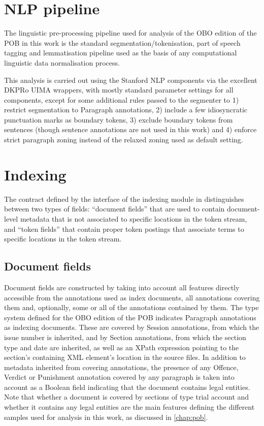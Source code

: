 \section{NLP pipeline}

The linguistic pre-processing pipeline used for analysis of the OBO edition of the POB in this work is the standard segmentation/tokenisation, part of speech tagging and lemmatisation pipeline used as the basis of any computational linguistic data normalisation process.

This analysis is carried out using the Stanford NLP components via the excellent DKPRo UIMA wrappers, with mostly standard parameter settings for all components, except for some additional rules passed to the segmenter to 1) restrict segmentation to Paragraph annotations, 2) include a few idiosyncratic punctuation marks as boundary tokens, 3) exclude boundary tokens from sentences (though sentence annotations are not used in this work) and 4) enforce strict paragraph zoning instead of the relaxed zoning used as default setting.

\section{Indexing}

The contract defined by the interface of the indexing module in  distinguishes between two types of fields: ``document fields'' that are used to contain document-level metadata that is not associated to specific locations in the token stream, and ``token fields'' that contain proper token postings that associate terms to specific locations in the token stream.

\subsection{Document fields}

Document fields are constructed by taking into account all features directly accessible from the annotations used as index documents, all annotations covering them and, optionally, some or all of the annotations contained by them.
The type system defined for the OBO edition of the POB indicates Paragraph annotations as indexing documents.
These are covered by Session annotations, from which the issue number is inherited, and by Section annotations, from which the section type and date are inherited, as well as an XPath expression pointing to the section's containing XML element's location in the source files.
In addition to metadata inherited from covering annotations, the presence of any Offence, Verdict or Punishment annotation covered by any paragraph is taken into account as a Boolean field indicating that the document contains legal entities.
Note that whether a document is covered by sections of type trial account and whether it contains any legal entities are the main features defining the different samples used for analysis in this work, as discussed in \autoref{chap:pob}.

